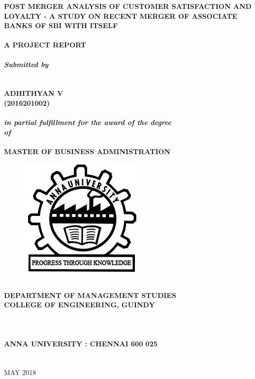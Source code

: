 \documentclass[a4paper, 12pt]{extarticle}
\newcommand\tab[1][1cm]{\hspace*{#1}}
\begin{document}
{
\selectfont
\begin{center}	
\textbf{\fontsize{18}{2} \selectfont POST MERGER ANALYSIS OF CUSTOMER SATISFACTION AND LOYALTY - A STUDY ON RECENT MERGER OF ASSOCIATE BANKS OF SBI WITH ITSELF}\\
\tab \\
\textbf{\fontsize{14}{2} \selectfont A PROJECT REPORT}\\
\tab \\
\textbf{\fontsize{14}{2} \selectfont \emph{Submitted by}}\\
\tab \\
\tab \\
{\fontsize{16}{2} \selectfont
\textbf{ADHITHYAN V}}\\
{\fontsize{16}{2} \selectfont \textbf{(2016201002)}}\\
\tab \\
\textbf{\emph{\fontsize{14}{2} \selectfont in partial fulfillment for the award of the degree\\ of}}\\
\tab \\
\textbf{\fontsize{16}{2} \selectfont MASTER OF BUSINESS ADMINISTRATION}\\
\begin{figure}[H]
\centering
\includegraphics[scale=0.5]{anna_univ_logo.jpg}
\end{figure}
\tab \\
\textbf{\fontsize{14}{2} \selectfont DEPARTMENT OF MANAGEMENT STUDIES}\\
\textbf{\fontsize{14}{2} \selectfont COLLEGE OF ENGINEERING, GUINDY}\\
\tab \\
\tab \\
\tab \\
\textbf{\fontsize{16}{2} \selectfont ANNA UNIVERSITY : CHENNAI 600 025}\\
\tab \\
\tab \\
{\fontsize{14}{2} \selectfont MAY 2018}\\
\end{center}


}
\end{document}
